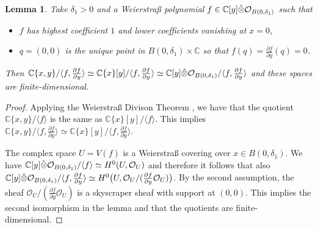 \documentclass[11pt,twoside]{amsart}
\theoremstyle{plain}
\newtheorem{lemma}[theorem]{Lemma}
\newcommand{\Sh}[1]{\mathcal{#1}} %
\newcommand{\dfx}{dx}
\begin{document}
\begin{lemma}
	\label{prep-for-univ-deformation-construction}
	Take $\delta_1>0$ and a Weierstraß polynomial $f \in \mathbb{C}[y]\Hat{\otimes}\Sh{O}_{B(0,\delta_1)}$ such that
	\begin{itemize}
		\item $f$ has highest coefficient $1$ and lower coefficients vanishing at $x=0$,
		\item $q=(0,0)$ is the unique point in $B(0,\delta_1)\times \mathbb{C}$ so that $f(q) = \tfrac{\partial f}{\partial y}(q)=0$.
	\end{itemize}
	Then
	$\mathbb{C}\{x,y\}/\langle f,\tfrac{\partial f}{\partial y}\rangle \simeq \mathbb{C}\{x\}[y]/\langle f,\tfrac{\partial f}{\partial y}\rangle\simeq\mathbb{C}[y]\Hat{\otimes}\Sh{O}_{B(0,\delta_1)}/\langle f,\tfrac{\partial f}{\partial y}\rangle$ and these spaces are finite-dimensional.
\end{lemma}

\begin{proof}
Applying the Weierstra{\ss} Divison Theorem \cite[Chapter I Theorem 1.1]{PR:94}, we have that the quotient $\mathbb{C}\{x,y\}/\langle f\rangle$ is the same as $\mathbb{C}\{x\}[y]/\langle f\rangle$. This implies $\mathbb{C}\{x,y\}/\langle f,\frac{\partial f}{\partial y}\rangle\simeq\mathbb{C}\{x\}[y]/\langle f,\frac{\partial f}{\partial y}\rangle$. 

The complex space $U=V(f)$ is a Weierstra{\ss} covering over $x\in B(0,\delta_1)$. We have $\mathbb{C}[y]\Hat{\otimes}\Sh{O}_{B(0,\delta_1)}/\langle f\rangle \simeq H^0(U,\Sh{O}_U)$ and therefore it follows that also $\mathbb{C}[y]\Hat{\otimes}\Sh{O}_{B(0,\delta_1)}/\langle f,\tfrac{\partial f}{\partial y}\rangle \simeq H^0\bigr(U,\Sh{O}_U/(\tfrac{\partial f}{\partial y } \Sh{O}_U)\bigr)$. By the second assumption, the sheaf $\Sh{O}_U/(\tfrac{\partial f}{\partial y } \Sh{O}_U)$ is a skyscraper sheaf with support at $(0,0)$. This implies the second isomorphism in the lemma and that the quotients are finite-dimensional.
\end{proof}
\end{document}
